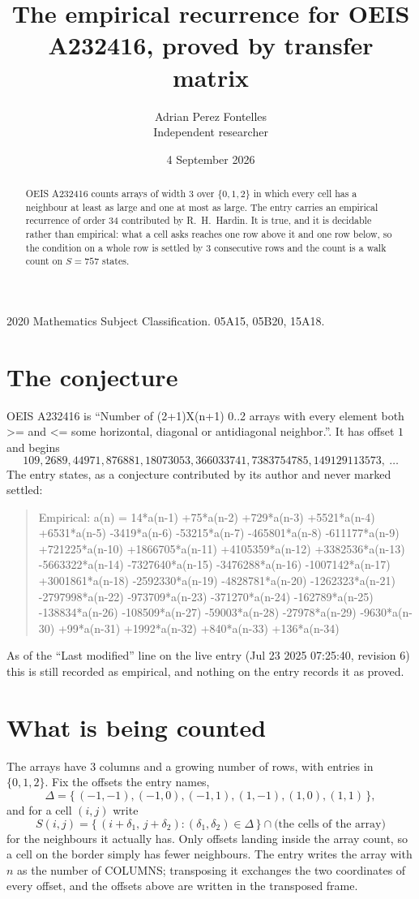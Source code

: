 \documentclass[11pt,a4paper]{article}
\title{The empirical recurrence for OEIS A232416, proved by transfer matrix}
\author{Adrian Perez Fontelles\\ \small Independent researcher}
\date{4 September 2026}
\theoremstyle{plain}
\theoremstyle{definition}
\begin{document}
\maketitle

\begin{abstract}
OEIS A232416 counts arrays of width $3$ over $\{0,1,2\}$ in which every cell has a neighbour at least as large and one at most as large. The entry carries an
empirical recurrence of order $34$ contributed by R.~H.~Hardin. It is true, and it is
decidable rather than empirical: what a cell asks reaches one row above it and one row below, so the
condition on a whole row is settled by $3$ consecutive rows and the count is a walk
count on $S=757$ states.
\end{abstract}

\noindent\small 2020 Mathematics Subject Classification. 05A15, 05B20, 15A18.\normalsize

\section{The conjecture}

OEIS A232416 is ``Number of (2+1)X(n+1) 0..2 arrays with every element both >= and <= some horizontal, diagonal or antidiagonal neighbor.''. It has offset $1$ and begins
\[
109, 2689, 44971, 876881, 18073053, 366033741, 7383754785, 149129113573,\ \dots
\]
The entry states, as a conjecture contributed by its author and never marked settled:
\begin{quote}
Empirical: a(n) = 14*a(n-1) +75*a(n-2) +729*a(n-3) +5521*a(n-4) +6531*a(n-5) -3419*a(n-6) -53215*a(n-7) -465801*a(n-8) -611177*a(n-9) +721225*a(n-10) +1866705*a(n-11) +4105359*a(n-12) +3382536*a(n-13) -5663322*a(n-14) -7327640*a(n-15) -3476288*a(n-16) -1007142*a(n-17) +3001861*a(n-18) -2592330*a(n-19) -4828781*a(n-20) -1262323*a(n-21) -2797998*a(n-22) -973709*a(n-23) -371270*a(n-24) -162789*a(n-25) -138834*a(n-26) -108509*a(n-27) -59003*a(n-28) -27978*a(n-29) -9630*a(n-30) +99*a(n-31) +1992*a(n-32) +840*a(n-33) +136*a(n-34)
\end{quote}
As of the ``Last modified'' line on the live entry (Jul 23 2025 07:25:40, revision 6) this is still
recorded as empirical, and nothing on the entry records it as proved.

\section{What is being counted}

The arrays have $3$ columns and a growing number of rows, with entries in $\{0,1,2\}$. Fix the
offsets the entry names,
\[
\Delta=\{\,(-1,-1), (-1,0), (-1,1), (1,-1), (1,0), (1,1)\,\},
\]
and for a cell $(i,j)$ write
\[
S(i,j)=\{\,(i+\delta_1,\,j+\delta_2) : (\delta_1,\delta_2)\in\Delta\,\}\cap
\text{(the cells of the array)}
\]
for the neighbours it actually has. Only offsets landing inside the array count, so a cell on
the border simply has fewer neighbours. The entry writes the array with $n$ as the number of COLUMNS; transposing it exchanges the two coordinates of every offset, and the offsets above are written in the transposed frame.
\end{document}
